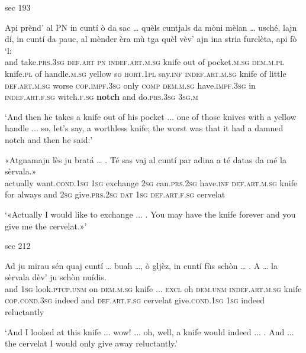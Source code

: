 sec 193

\begin{linenumbers}
	\gll  Api prènd’ al \textsc{PN} in cuntí ò da sac … quèls cuntjals da mòni mèlan … usché, lajn dí, in cuntí da pauc, al mènder èra mù tga quèl vèv’ ajn ina stria furclèta, api fò ‘l: \\
	and take.\textsc{prs.3sg} \textsc{def.art} \textsc{pn} \textsc{indef.art.m.sg} knife out of pocket.\textsc{m.sg} {} \textsc{dem.m.pl} knife.\textsc{pl} of handle.\textsc{m.sg} yellow {} so \textsc{hort.1pl} say.\textsc{inf} \textsc{indef.art.m.sg} knife of little \textsc{def.art.m.sg} worse \textsc{cop.impf.3sg} only  \textsc{comp} \textsc{dem.m.sg} have.\textsc{impf.3sg} in \textsc{indef.art.f.sg} witch.\textsc{f.sg} \textbf{notch} and do.\textsc{prs.3sg} \textsc{3sg.m}\\
\end{linenumbers}
\medskip
\glt `And then he takes a knife out of his pocket ... one of those knives with a yellow handle ... so, let's say, a worthless knife; the worst was that it had a damned notch and then he said:'
\medskip

\begin{linenumbers}
	\gll  «Atgnamajn lès ju bratá … . Té sas vaj al cuntí par adina a té datas da mé la sèrvala.»  \\
	actually want.\textsc{cond.1sg} \textsc{1sg} exchange {} {} \textsc{2sg} can.\textsc{prs.2sg} have.\textsc{inf} \textsc{def.art.m.sg} knife for always and \textsc{2sg} give.\textsc{prs.2sg} \textsc{dat} \textsc{1sg} \textsc{def.art.f.sg} cervelat\\
\end{linenumbers}
\medskip
\glt `«Actually I would like to exchange ... . You may have the knife forever and you give me the cervelat.»'
\medskip

sec 212

\begin{linenumbers}
	\gll Ad ju mirau sén quaj cuntí … buah …, ò gljèz, in cuntí fùs schòn … . A … la sèrvala dèv’ ju schòn nuídis.    \\
	and \textsc{1sg} look.\textsc{ptcp.unm} on \textsc{dem.m.sg} knife ... \textsc{excl} {} oh \textsc{dem.unm} \textsc{indef.art.m.sg} knife \textsc{cop.cond.3sg} indeed {} {} and {} \textsc{def.art.f.sg} cervelat give.\textsc{cond.1sg} \textsc{1sg} indeed reluctantly\\
\end{linenumbers}
\medskip
\glt `And I looked at this knife ... wow! ... oh, well, a knife would indeed ... . And ... the cervelat I would only give away reluctantly.'
\medskip

